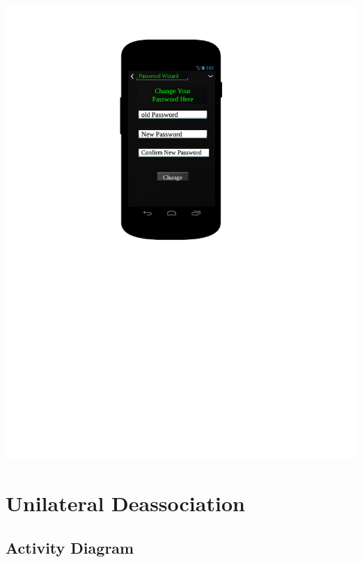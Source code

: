 \includegraphics[scale=0.7]{images/PasswordChange_UI}

\section{Unilateral Deassociation}

\newpage
\subsection{Activity Diagram}

